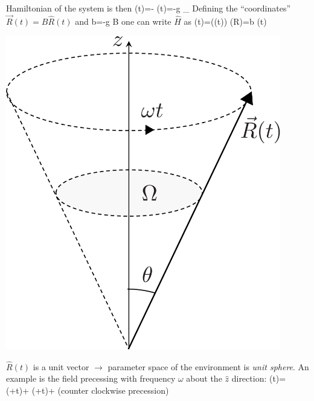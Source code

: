 \documentclass[12pt]{article}
\begin{document}
\begin{minipage}{0.6\textwidth}
\setcounter{equation}{77}
Hamiltonian of the system is then
\be
{}(t)=-\hat{\vec{\mu}} \cdot {}(t)=-g _{}  \cdot {}
\ee	
Defining the ``coordinates'' $\vec{R}(t)=B \hat{R}(t)$ and
\be
b=-g  B
\ee
one can write $\hat{H}$ as
\be
{}(t)=((t)) \equiv {}(R)=b (t) \cdot {}
\label{eq:g80}
\ee
\end{minipage}%
\begin{minipage}{0.4\textwidth}
\hfill\includegraphics[width=0.9\textwidth]{Figures/RotatingVector-crop.pdf}
\end{minipage}

$\hat{R}(t)$ is a unit vector $\rightarrow$ parameter space of the
environment is \emph{unit sphere}.
An example is the field precessing with
frequency $\omega$ about the $\hat{z}$ direction:
\be
{}(t)= \sin \theta \cos (\phi+\omega t)+  \sin \theta \sin (\phi+\omega t)+ \cos \theta
\label{eq:g81}
\ee
(counter clockwise precession)

\end{document}
